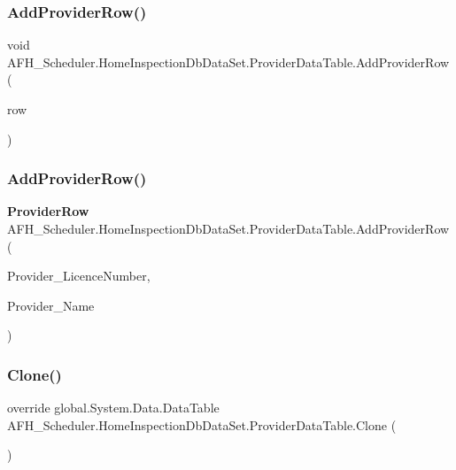\subsubsection{AddProviderRow()\hspace{0.1cm}{\footnotesize\ttfamily [1/2]}}
{\footnotesize\ttfamily void A\+F\+H\+\_\+\+Scheduler.\+Home\+Inspection\+Db\+Data\+Set.\+Provider\+Data\+Table.\+Add\+Provider\+Row (\begin{DoxyParamCaption}\item[{\textbf{ Provider\+Row}}]{row }\end{DoxyParamCaption})}

\mbox{\label{class_a_f_h___scheduler_1_1_home_inspection_db_data_set_1_1_provider_data_table_aa04fb11f6ba533d712ab0cb09917fdb6}} 
\subsubsection{AddProviderRow()\hspace{0.1cm}{\footnotesize\ttfamily [2/2]}}
{\footnotesize\ttfamily \textbf{ Provider\+Row} A\+F\+H\+\_\+\+Scheduler.\+Home\+Inspection\+Db\+Data\+Set.\+Provider\+Data\+Table.\+Add\+Provider\+Row (\begin{DoxyParamCaption}\item[{string}]{Provider\+\_\+\+Licence\+Number,  }\item[{string}]{Provider\+\_\+\+Name }\end{DoxyParamCaption})}

\mbox{\label{class_a_f_h___scheduler_1_1_home_inspection_db_data_set_1_1_provider_data_table_ad4ca5b68a83ab76e98f5db2f124b8982}} 
\subsubsection{Clone()}
{\footnotesize\ttfamily override global.\+System.\+Data.\+Data\+Table A\+F\+H\+\_\+\+Scheduler.\+Home\+Inspection\+Db\+Data\+Set.\+Provider\+Data\+Table.\+Clone (\begin{DoxyParamCaption}{ }\end{DoxyParamCaption})}

